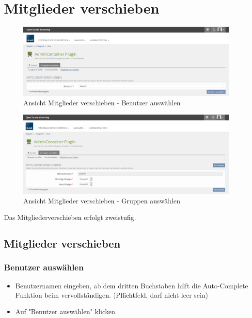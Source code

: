 \section{Mitglieder verschieben}
\begin{figure}
	\centering
	\includegraphics[width=1\textwidth]{img/mitgliederVerschieben1.png}
	\caption{Ansicht Mitglieder verschieben - Benutzer auswählen}
\end{figure}
\begin{figure}
	\centering
	\includegraphics[width=1\textwidth]{img/mitgliederVerschieben2.png}
	\caption{Ansicht Mitglieder verschieben - Gruppen auswählen}
\end{figure}

Das Mitgliederverschieben erfolgt zweistufig. 
\subsection*{Mitglieder verschieben}
\subsubsection*{Benutzer auswählen}
\begin{itemize}
	\item Benutzernamen eingeben, ab dem dritten Buchstaben hilft die Auto-Complete Funktion beim vervollständigen. (Pflichtfeld, darf nicht leer sein)
	\item Auf "Benutzer auswählen" klicken
\end{itemize}
